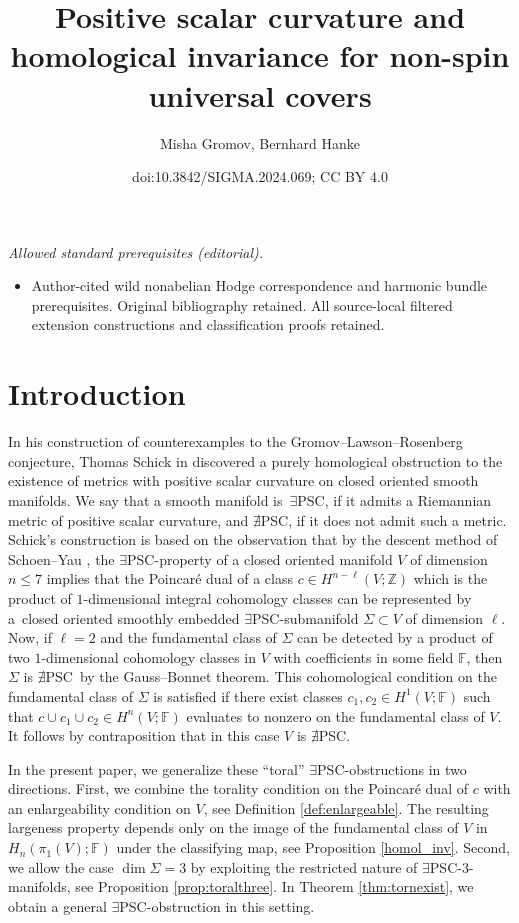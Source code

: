 \documentclass[10pt,a4paper]{amsart}
\title{Positive scalar curvature and homological invariance for non-spin universal covers}
\author{Misha Gromov, Bernhard Hanke}
\date{doi:10.3842/SIGMA.2024.069; CC BY 4.0}
\numberwithin{equation}{section}
\newcommand{\F}{\mathbb{F}}
\newcommand{\Z}{\mathbb{Z}}
\newcommand{\no}{{\color{brown!70!black}$\nexists$}{\sf PSC}}
\newcommand{\yes}{{\color {blue!70!black}$\exists$}{\sf PSC}}
\begin{document}
\maketitle
\noindent\textit{Allowed standard prerequisites (editorial).}\begin{itemize}
\item Author-cited wild nonabelian Hodge correspondence and harmonic bundle prerequisites. Original bibliography retained. All source-local filtered extension constructions and classification proofs retained.
\end{itemize}\medskip
\section{Introduction}

In his construction of counterexamples to the Gromov--Lawson--Rosenberg conjecture, Thomas Schick in \cite{Sch98} discovered a purely homological obstruction to the existence of metrics with positive scalar curvature on closed oriented smooth manifolds.
We say that a smooth manifold is~\yes, if it admits a Riemannian metric of positive scalar curvature, and \no, if it does not admit such a metric.
Schick's construction is based on the observation that by the descent method of Schoen--Yau \cite{S-Y1979,SY}, the \yes-property of a closed oriented manifold $V$ of dimension~${n \leq 7}$ implies that the Poincar\'e dual of a class $c \in H^{n-\ell}(V; \Z)$ which is the product of $1$-dimensional integral cohomology classes can be represented by a~closed oriented smoothly embedded \yes-submanifold $\Sigma \subset V$ of dimension $\ell$.
Now, if $\ell = 2$ and the fundamental class of $\Sigma$ can be detected by a product of two $1$-dimensional cohomology classes in $V$ with coefficients in some field $\F$, then $\Sigma$ is \no~by the Gauss--Bonnet theorem.
This cohomological condition on the fundamental class of $\Sigma$ is satisfied if there exist classes $c_1, c_2 \in H^1(V; \F)$ such that $c \cup c_1 \cup c_2 \in H^n(V; \F)$ evaluates to nonzero on the fundamental class of $V$.
It follows by contraposition that in this case $V$ is \no.

In the present paper, we generalize these ``toral'' \yes-obstructions in two directions.
First, we combine the torality condition on the Poincar\'e dual of $c$ with an enlargeability condition on $V$, see Definition \ref{def:enlargeable}.
The resulting largeness property depends only on the image of the fundamental class of $V$ in $H_n( \pi_1(V) ; \F)$ under the classifying map, see Proposition \ref{homol_inv}.
Second, we allow the case $\dim \Sigma = 3$ by exploiting the restricted nature of \yes-$3$-manifolds, see Proposition \ref{prop:toralthree}.
In Theorem \ref{thm:tornexist}, we obtain a general \yes-obstruction in this setting.
\end{document}
